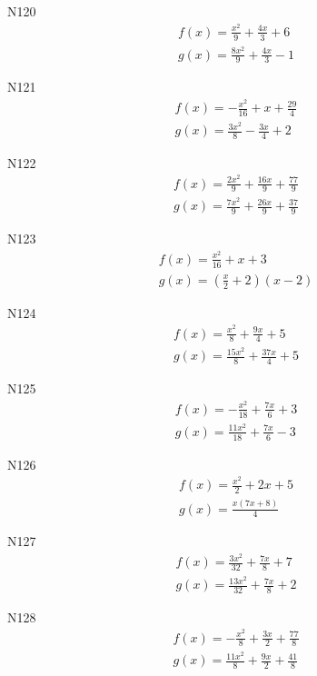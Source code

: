 \documentclass[11pt]{report}
\begin{document}
N120
\begin{align*}
 f(x) = \frac{x^{2}}{9} + \frac{4 x}{3} + 6\\
 g(x) = \frac{8 x^{2}}{9} + \frac{4 x}{3} - 1
\end{align*}

N121
\begin{align*}
 f(x) = - \frac{x^{2}}{16} + x + \frac{29}{4}\\
 g(x) = \frac{3 x^{2}}{8} - \frac{3 x}{4} + 2
\end{align*}

N122
\begin{align*}
 f(x) = \frac{2 x^{2}}{9} + \frac{16 x}{9} + \frac{77}{9}\\
 g(x) = \frac{7 x^{2}}{9} + \frac{26 x}{9} + \frac{37}{9}
\end{align*}

N123
\begin{align*}
 f(x) = \frac{x^{2}}{16} + x + 3\\
 g(x) = \left(\frac{x}{2} + 2\right) \left(x - 2\right)
\end{align*}

N124
\begin{align*}
 f(x) = \frac{x^{2}}{8} + \frac{9 x}{4} + 5\\
 g(x) = \frac{15 x^{2}}{8} + \frac{37 x}{4} + 5
\end{align*}

N125
\begin{align*}
 f(x) = - \frac{x^{2}}{18} + \frac{7 x}{6} + 3\\
 g(x) = \frac{11 x^{2}}{18} + \frac{7 x}{6} - 3
\end{align*}

N126
\begin{align*}
 f(x) = \frac{x^{2}}{2} + 2 x + 5\\
 g(x) = \frac{x \left(7 x + 8\right)}{4}
\end{align*}

N127
\begin{align*}
 f(x) = \frac{3 x^{2}}{32} + \frac{7 x}{8} + 7\\
 g(x) = \frac{13 x^{2}}{32} + \frac{7 x}{8} + 2
\end{align*}

N128
\begin{align*}
 f(x) = - \frac{x^{2}}{8} + \frac{3 x}{2} + \frac{77}{8}\\
 g(x) = \frac{11 x^{2}}{8} + \frac{9 x}{2} + \frac{41}{8}
\end{align*}
\end{document}
